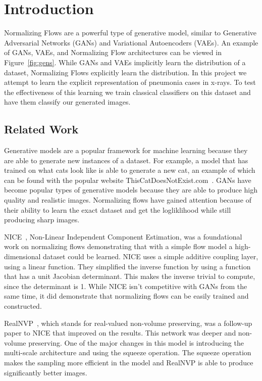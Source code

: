 \section{Introduction} 
Normalizing Flows are a powerful type of generative
model, similar to Generative Adversarial Networks (GANs) and Variational
Autoencoders (VAEs). An example of GANs, VAEs, and Normalizing Flow
architectures can be viewed in Figure~\ref{fig:gens}. While GANs and VAEs
implicitly learn the distribution of a dataset, Normalizing Flows explicitly
learn the distribution. In this project we attempt to learn the explicit
representation of pneumonia cases in x-rays. To test the effectiveness of this
learning we train classical classifiers on this dataset and have them classify
our generated images.

\subsection{Related Work}
Generative models are a popular framework for machine learning because they are
able to generate new instances of a dataset. For example, a model that has
trained on what cats look like is able to generate a new cat, an example of
which can be found with the popular website
ThisCatDoesNotExist.com~\cite{tcdne}. GANs have become popular types of
generative models because they are able to produce high quality and realistic
images. Normalizing flows have gained attention because of their ability to
learn the exact dataset and get the logliklihood while still producing sharp
images. 

NICE~\cite{nice}, Non-Linear Independent Component Estimation,  was a
foundational work on normalizing flows demonstrating that with a simple flow
model a high-dimensional dataset could be learned. NICE uses a simple additive
coupling layer, using a linear function. They simplified the inverse function by
using a function that has a unit Jacobian determinant. This makes the inverse
trivial to compute, since the determinant is 1. While NICE isn't competitive
with GANs from the same time, it did demonstrate that normalizing flows can be
easily trained and constructed.

RealNVP~\cite{realnvp}, which stands for real-valued non-volume preserving, was
a follow-up paper to NICE that improved on the results. This network was deeper
and non-volume preserving. One of the major changes in this model is introducing
the multi-scale architecture and using the squeeze operation. The squeeze
operation makes the sampling more efficient in the model and RealNVP is able to
produce significantly better images.

